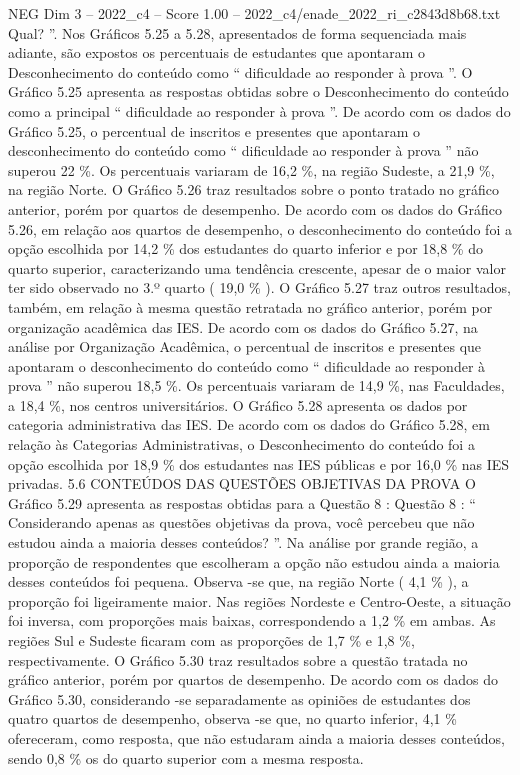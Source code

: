 \begin{textsample}{NEG Dim 3 – 2022\_c4 – Score 1.00 – 2022\_c4/enade\_2022\_ri\_c2843d8b68.txt}
Qual? ”.
Nos Gráficos 5.25 a 5.28, apresentados de forma sequenciada mais adiante, são expostos os percentuais de estudantes que apontaram o Desconhecimento do conteúdo como “ dificuldade ao responder à prova ”.
O Gráfico 5.25 apresenta as respostas obtidas sobre o Desconhecimento do conteúdo como a principal “ dificuldade ao responder à prova ”.
De acordo com os dados do Gráfico 5.25, o percentual de inscritos e presentes que apontaram o desconhecimento do conteúdo como “ dificuldade ao responder à prova ” não superou 22 \%.
Os percentuais variaram de 16,2 \%, na região Sudeste, a 21,9 \%, na região Norte.
O Gráfico 5.26 traz resultados sobre o ponto tratado no gráfico anterior, porém por quartos de desempenho.
De acordo com os dados do Gráfico 5.26, em relação aos quartos de desempenho, o desconhecimento do conteúdo foi a opção escolhida por 14,2 \% dos estudantes do quarto inferior e por 18,8 \% do quarto superior, caracterizando uma tendência crescente, apesar de o maior valor ter sido observado no 3.º quarto ( 19,0 \% ).
O Gráfico 5.27 traz outros resultados, também, em relação à mesma questão retratada no gráfico anterior, porém por organização acadêmica das IES.
De acordo com os dados do Gráfico 5.27, na análise por Organização Acadêmica, o percentual de inscritos e presentes que apontaram o desconhecimento do conteúdo como “ dificuldade ao responder à prova ” não superou 18,5 \%.
Os percentuais variaram de 14,9 \%, nas Faculdades, a 18,4 \%, nos centros universitários.
O Gráfico 5.28 apresenta os dados por categoria administrativa das IES.
De acordo com os dados do Gráfico 5.28, em relação às Categorias Administrativas, o Desconhecimento do conteúdo foi a opção escolhida por 18,9 \% dos estudantes nas IES públicas e por 16,0 \% nas IES privadas. 5.6 CONTEÚDOS DAS QUESTÕES OBJETIVAS DA PROVA O Gráfico 5.29 apresenta as respostas obtidas para a Questão 8 : Questão 8 : “ Considerando apenas as questões objetivas da prova, você percebeu que não estudou ainda a maioria desses conteúdos? ”.
Na análise por grande região, a proporção de respondentes que escolheram a opção não estudou ainda a maioria desses conteúdos foi pequena.
Observa -se que, na região Norte ( 4,1 \% ), a proporção foi ligeiramente maior.
Nas regiões Nordeste e Centro-Oeste, a situação foi inversa, com proporções mais baixas, correspondendo a 1,2 \% em ambas.
As regiões Sul e Sudeste ficaram com as proporções de 1,7 \% e 1,8 \%, respectivamente.
O Gráfico 5.30 traz resultados sobre a questão tratada no gráfico anterior, porém por quartos de desempenho.
De acordo com os dados do Gráfico 5.30, considerando -se separadamente as opiniões de estudantes dos quatro quartos de desempenho, observa -se que, no quarto inferior, 4,1 \% ofereceram, como resposta, que não estudaram ainda a maioria desses conteúdos, sendo 0,8 \% os do quarto superior com a mesma resposta.

\end{textsample}
